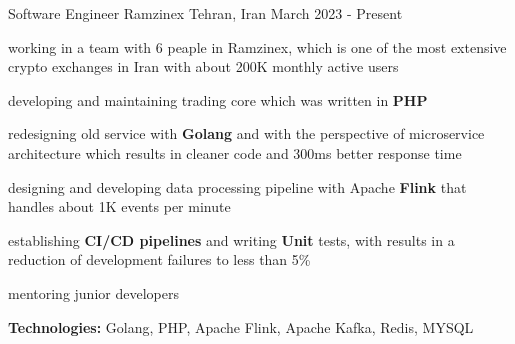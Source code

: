 

\begin{cventries}

  \cventry
    {Software Engineer} %
    {Ramzinex} %
    {Tehran, Iran} %
    {March 2023 - Present} %
    {
      \begin{cvitems} %
        \item working in a team with 6 peaple in Ramzinex, which is one of the most extensive crypto exchanges in Iran with about 200K monthly active users
        \item developing and maintaining trading core which was written in \textbf{PHP}
        \item redesigning old service with \textbf{Golang} and with the perspective of microservice architecture which results in cleaner code and 300ms better response time
        \item designing and developing data processing pipeline with Apache \textbf{Flink} that handles about 1K events per minute
        \item establishing \textbf{CI/CD pipelines} and writing \textbf{Unit} tests, with results in a reduction of development failures to less than 5\%
        \item mentoring junior developers
        \item \textbf{Technologies:} Golang, PHP, Apache Flink, Apache Kafka, Redis, MYSQL
      \end{cvitems}
    }


\end{cventries}
